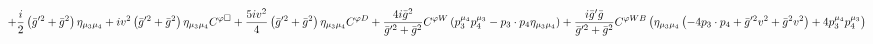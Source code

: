 %
\begin{dmath*}
%
  +  \frac{i}{2}\left({\bar g}^{\prime 2} + {\bar g}{}^2\right) \eta_{\mu_3 \mu_4}  +  i v^2\left({\bar g}^{\prime 2} + {\bar g}{}^2\right) \eta_{\mu_3 \mu_4} C^{ \varphi  \Box}  +  \frac{5 i v^2}{4}\left({\bar g}^{\prime 2} + {\bar g}{}^2\right) \eta_{\mu_3 \mu_4} C^{ \varphi  D}  +  \frac{4 i {\bar g}{}^2}{{\bar g}^{\prime 2} + {\bar g}{}^2}C^{ \varphi  W} \left(p_3^{\mu_4} p_4^{\mu_3} - p_{3}\nobreak\cdot\nobreak{}p_{4} \eta_{\mu_3 \mu_4}\right)  +  \frac{i {\bar g}^\prime {\bar g}{}}{{\bar g}^{\prime 2} + {\bar g}{}^2}C^{ \varphi  WB} \left(\eta_{\mu_3 \mu_4} \left( - 4 p_{3}\nobreak\cdot\nobreak{}p_{4} + {\bar g}^{\prime 2} v^2 + {\bar g}{}^2 v^2\right) + 4 p_3^{\mu_4} p_4^{\mu_3}\right)
%
\end{dmath*}
%
